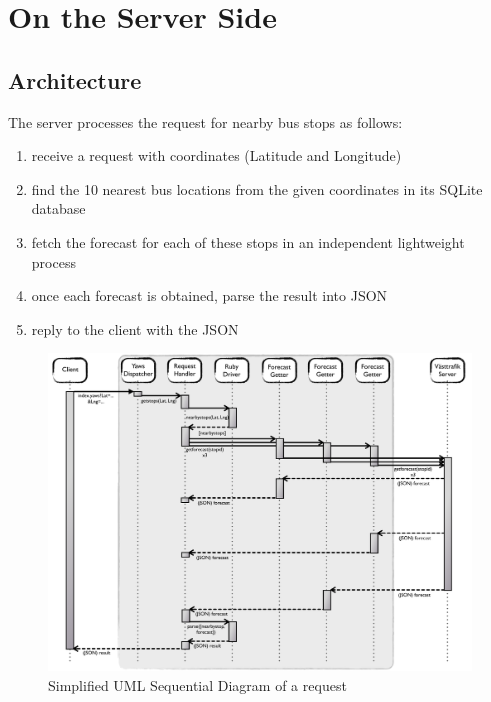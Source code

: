 \chapter{On the Server Side}
\label{cha:on_the_server_side}

\section{Architecture}

The server processes the request for nearby bus stops as follows:

\begin{enumerate}
\item{receive a request with coordinates (Latitude and Longitude)}
\item{find the 10 nearest bus locations from the given coordinates in its SQLite database}
\item{fetch the forecast for each of these stops in an independent lightweight process}
\item{once each forecast is obtained, parse the result into JSON}
\item{reply to the client with the JSON}
\end{enumerate}

\begin{figure}[ht]
\center
\includegraphics[scale=0.4]{pics/message_passing}
\caption{Simplified UML Sequential Diagram of a request}
\label{fig:message_passing}
\end{figure}


